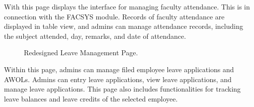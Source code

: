     With this page displays the interface for managing faculty attendance. This is in connection with the FACSYS module. Records of faculty attendance are displayed in table view, and admins can manage attendance records, including the subject attended, day, remarks, and date of attendance.

    \begin{figure}[H]
        \centering
        \caption{Redesigned Leave Management Page.}
        \label{fig:leave-mgt}
    \end{figure}

    Within this page, admins can manage filed employee leave applications and AWOLs. Admins can entry leave applications, view leave applications, and manage leave applications. This page also includes functionalities for tracking leave balances and leave credits of the selected employee.

